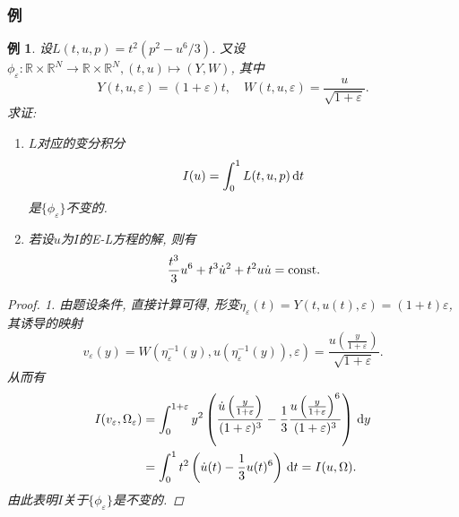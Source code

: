\documentclass[12pt,a4paper]{article}
\newtheorem{example}[theorem]{例}
\begin{document}
\subsubsection{例}

\begin{example}
    设$L(t, u, p) = t^2(p^2 - u^6/3)$. 又设$\phi_{\varepsilon}\colon \mathbb{R} \times \mathbb{R}^N \rightarrow \mathbb{R} \times \mathbb{R}^N , (t, u) \mapsto(Y, W)$, 其中 
    \begin{equation*}
        Y(t, u, \varepsilon) = (1 + \varepsilon)t, \quad W(t, u, \varepsilon) = \frac{u}{\sqrt{1 + \varepsilon}}. 
    \end{equation*}
    求证:
    \begin{enumerate}
        \item $L$对应的变分积分 
        \begin{equation*}
            I(u) = \int_0^1L(t, u, p) \,{\rm d}t
        \end{equation*}
        是$\{\phi_{\varepsilon}\}$不变的.
        \item 若设$u$为$I$的E-L方程的解, 则有 
        \begin{equation*}
            \frac{t^3}{3}u^6 + t^3\dot u^2 + t^2u\dot u = {\rm const}.
        \end{equation*}
    \end{enumerate}
    \begin{proof}
        1. 由题设条件, 直接计算可得, 形变$\eta_{\varepsilon}(t) = Y(t, u(t), \varepsilon) = (1 + t)\varepsilon$, 其诱导的映射 
        \begin{equation*}
            v_{\varepsilon}(y) = W(\eta_{\varepsilon}^{-1}(y), u(\eta_{\varepsilon}^{-1}(y)), \varepsilon) = \frac{u\left(\frac{y}{1 + \varepsilon}\right)}{\sqrt{1 + \varepsilon}}.
        \end{equation*}
        从而有 
        \begin{align*}
            I(v_{\varepsilon}, \Omega_{\varepsilon}) &= \int_0^{1 + \varepsilon}y^2\left(\frac{\dot u\left(\frac{y}{1 + \varepsilon}\right)}{(1 + \varepsilon)^3} - \frac{1}{3}\frac{u\left(\frac{y}{1 + \varepsilon}\right)^6}{(1 + \varepsilon)^3}\right) \,{\rm d}y \\  
            &= \int_0^1t^2\left(\dot u(t) - \frac{1}{3}u(t)^6\right) \,{\rm d}t =I(u, \Omega).
        \end{align*}
        由此表明$I$关于$\{\phi_{\varepsilon}\}$是不变的.


\end{proof}
\end{example}
\end{document}
